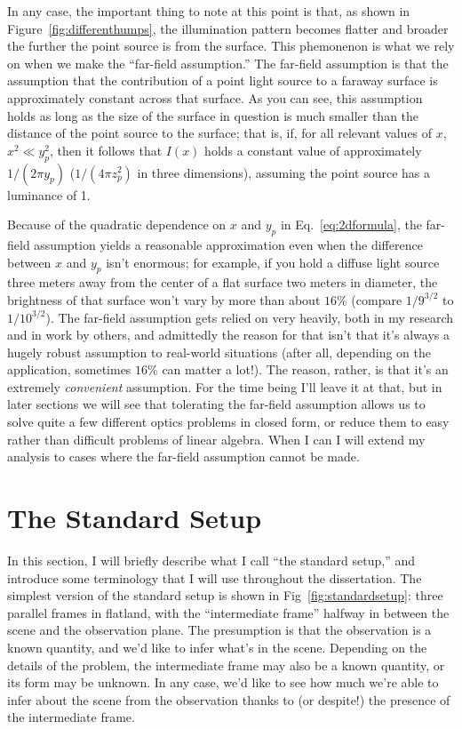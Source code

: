 In any case, the important thing to note at this point is that, as shown in Figure~\ref{fig:differenthumps}, the illumination pattern becomes flatter and broader the further the point source is from the surface. This phemonenon is what we rely on when we make the ``far-field assumption.'' The far-field assumption is that the assumption that the contribution of a point light source to a faraway surface is approximately constant across that surface. As you can see, this assumption holds as long as the size of the surface in question is much smaller than the distance of the point source to the surface; that is, if, for all relevant values of $x$, $x^2 \ll y_p^2$, then it follows that $I(x)$ holds a constant value of approximately $1/(2\pi y_p)$ ($1/(4\pi z_p^2)$ in three dimensions), assuming the point source has a luminance of 1. 

Because of the quadratic dependence on $x$ and $y_p$ in Eq.~\ref{eq:2dformula}, the far-field assumption yields a reasonable approximation even when the difference between $x$ and $y_p$ isn't enormous; for example, if you hold a diffuse light source three meters away from the center of a flat surface two meters in diameter, the brightness of that surface won't vary by more than about $16\%$ (compare $1/9^{3/2}$ to $1/10^{3/2}$). The far-field assumption gets relied on very heavily, both in my research and in work by others, and admittedly the reason for that isn't that it's always a hugely robust assumption to real-world situations (after all, depending on the application, sometimes $16\%$ can matter a lot!). The reason, rather, is that it's an extremely \emph{convenient} assumption. For the time being I'll leave it at that, but in later sections we will see that tolerating the far-field assumption allows us to solve quite a few different optics problems in closed form, or reduce them to easy rather than difficult problems of linear algebra. When I can I will extend my analysis to cases where the far-field assumption cannot be made.

\section{The Standard Setup}

In this section, I will briefly describe what I call ``the standard setup,'' and introduce some terminology that I will use throughout the dissertation. The simplest version of the standard setup is shown in Fig~\ref{fig:standardsetup}: three parallel frames in flatland, with the ``intermediate frame'' halfway in between the scene and the observation plane. The presumption is that the observation is a known quantity, and we'd like to infer what's in the scene. Depending on the details of the problem, the intermediate frame may also be a known quantity, or its form may be unknown. In any case, we'd like to see how much we're able to infer about the scene from the observation thanks to (or despite!) the presence of the intermediate frame.

